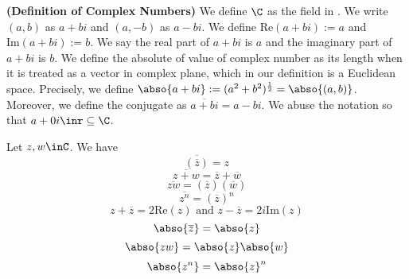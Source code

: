\documentclass{report}
\begin{document}
\begin{definition}
\label{1.6.2}
\textbf{(Definition of Complex Numbers)} We define $\C$ as the field in  . We write $(a,b)$ as $a+bi$ and $(a,-b)$ as $a-bi$. We define $\text{Re}(a+bi):=a$ and $\text{Im}(a+bi):=b$. We say the real part of  $a+bi$ is  $a$ and the imaginary part of  $a+bi$ is  $b$. We define the absolute of value of complex number as its length when it is treated as a vector in complex plane, which in our definition is a Euclidean space. Precisely, we define $\abso{a+bi}:=(a^2+b^2)^{\frac{1}{2}}=\abso{(a,b)}$. Moreover, we define the conjugate as  $\overline{a+bi}=a-bi$. We abuse the notation so that $a+0i\inr\subseteq\C$. 
\end{definition}
\begin{theorem}
\label{1.6.3}
Let $z,w\inC$. We have
\begin{equation*}
\overline{(\overline{z})}=z
\end{equation*}
\begin{equation*}
\overline{z+w}=\overline{z}+\overline{w} 
\end{equation*}
\begin{equation*}
\overline{zw}=(\overline{z})(\overline{w})
\end{equation*}
\begin{equation*}
  \overline{z^n}=(\overline{z})^n
\end{equation*}
\begin{equation*}
z+\overline{z}=2\text{Re}(z)\text{ and }z-\overline{z}=2i\text{Im}(z)
\end{equation*}
\begin{equation*}
\abso{\overline{z}}=\abso{z}
\end{equation*}
\begin{equation*}
\abso{zw}=\abso{z}\abso{w}
\end{equation*}
\begin{equation*}
\abso{z^n}=\abso{z}^n
\end{equation*}
\end{theorem}
\end{document}
